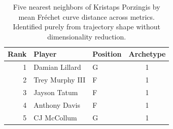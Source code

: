 \begin{table}[htbp]
  \centering\small
  \begin{tabular}{rllc}
    \toprule
    Rank & Player & Position & Archetype \\
    \midrule
    1 & Damian Lillard & G & 1 \\
    2 & Trey Murphy III & F & 1 \\
    3 & Jayson Tatum & F & 1 \\
    4 & Anthony Davis & F & 1 \\
    5 & CJ McCollum & G & 1 \\
    \bottomrule
  \end{tabular}
  \caption{Five nearest neighbors of Kristaps Porzingis by mean Fr\'{e}chet curve distance across metrics. Identified purely from trajectory shape without dimensionality reduction.}
  \label{tab:Kristaps_Porzingis_frechet_curve_neighbors}
\end{table}

